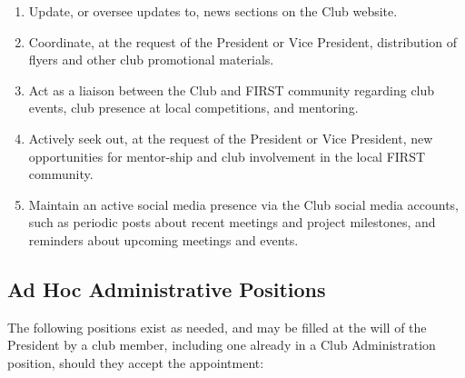 \documentclass[english,11pt]{article}
\begin{document}
\begin{enumerate}[label=\Alph*.]
    \item Update, or oversee updates to, news sections on the Club website.
    \item Coordinate, at the request of the President or Vice President, distribution of flyers and other club promotional materials.
    \item Act as a liaison between the Club and FIRST community regarding club events, club presence at local competitions, and mentoring.
    \item Actively seek out, at the request of the President or Vice President, new opportunities for mentor-ship and club involvement in the local FIRST community.
    \item Maintain an active social media presence via the Club social media accounts, such as periodic posts about recent meetings and project milestones, and reminders about upcoming meetings and events.
\end{enumerate}

\subsection{Ad Hoc Administrative Positions} \label{sect:cadmin:adhoc}
The following positions exist as needed, and may be filled at the will of the President by a club member, including one already in a Club Administration position, should they accept the appointment:
\end{document}
